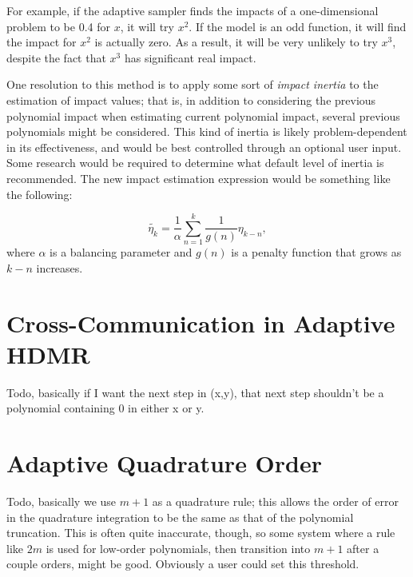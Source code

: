 For example, if the adaptive sampler finds the impacts of a one-dimensional problem to be 0.4 for $x$, it will
try $x^2$.  If the model is an odd function, it will find the impact for $x^2$ is actually zero.  As a result,
it will be very unlikely to try $x^3$, despite the fact that $x^3$ has significant real impact.

One resolution to this method is to apply some sort of \emph{impact inertia} to the estimation of impact
values; that is, in addition to considering the previous polynomial impact when estimating current polynomial
impact, several previous polynomials might be considered.  This kind of inertia is likely problem-dependent in
its effectiveness, and would be best controlled through an optional user input.  Some research would be
required to determine what default level of inertia is recommended.  The new impact estimation expression
would be something like the following:

\begin{equation}
  \tilde{\eta_k}= \frac{1}{\alpha}\sum_{n=1}^k \frac{1}{g(n)}\eta_{k-n},
\end{equation}
where $\alpha$ is a balancing parameter and $g(n)$ is a penalty function that grows as $k-n$ increases.

\section{Cross-Communication in Adaptive HDMR}
Todo, basically if I want the next step in (x,y), that next step shouldn't be a polynomial containing 0 in
either x or y.

\section{Adaptive Quadrature Order}
Todo, basically we use $m+1$ as a quadrature rule; this allows the order of error in the quadrature integration to be the same as
that of the polynomial truncation.  This is often quite inaccurate, though, so some system where a rule like $2m$ is used for
low-order polynomials, then transition into $m+1$ after a couple orders, might be good.  Obviously a user could set this threshold.
